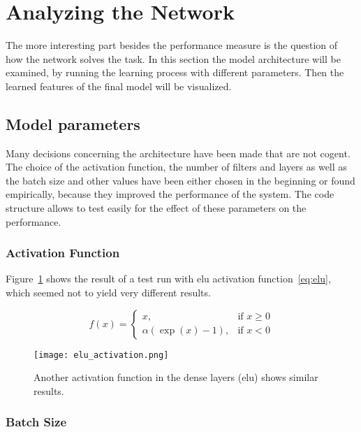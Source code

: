\documentclass[main.tex]{subfiles}
\begin{document}
\section{Analyzing the Network}
The more interesting part besides the performance measure is the question of how the network solves the task. In this section the model architecture will be examined, by running the learning process with different parameters. Then the learned features of the final model will be visualized.


\subsection{Model parameters}
Many decisions concerning the architecture have been made that are not cogent. The choice of the activation function, the number of filters and layers as well as the batch size and other values have been either chosen in the beginning or found empirically, because they improved the performance of the system. The code structure allows to test easily for the effect of these parameters on the performance. 

\subsubsection{Activation Function}

Figure~\ref{fig:other_act} shows the result of a test run with elu activation function~\ref{eq:elu}, which seemed not to yield very different results.

\begin{equation} \label{eq:elu}
f(x)= \begin{cases}
    x,& \text{if } x\geq 0\\
    \alpha\left(\exp(x) - 1\right), & \text{if } x < 0
    \end{cases}
\end{equation}

\begin{figure}
\begin{center}
\texttt{[image: elu\_activation.png]}
\end{center}
\caption{Another activation function in the dense layers (elu) shows similar results.}
\label{fig:other_act}
\end{figure}

\subsubsection{Batch Size}
\end{document}
